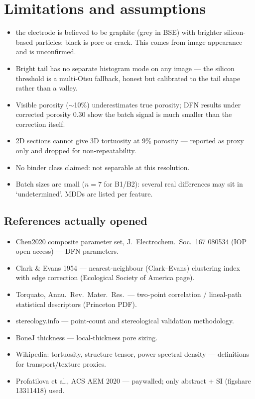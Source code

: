 \documentclass[11pt,a4paper]{article}
\begin{document}
\section{Limitations and assumptions}
\begin{itemize}
\item the electrode is believed to be graphite (grey in BSE) with brighter silicon-based particles; black is pore or crack. This comes from image appearance and is unconfirmed.
\item Bright tail has no separate histogram mode on any image --- the
silicon threshold is a multi-Otsu fallback, honest but calibrated to the
tail shape rather than a valley.
\item Visible porosity ($\sim$10\%) underestimates true porosity; DFN
results under corrected porosity 0.30 show the batch signal is much smaller
than the correction itself.
\item 2D sections cannot give 3D tortuosity at 9\% porosity --- reported as
proxy only and dropped for non-repeatability.
\item No binder class claimed: not separable at this resolution.
\item Batch sizes are small ($n{=}7$ for B1/B2): several real differences
may sit in `undetermined'. MDDs are listed per feature.
\end{itemize}

\subsection{References actually opened}
\begin{itemize}
\item Chen2020 composite parameter set, J.\ Electrochem.\ Soc.\ 167
080534 (IOP open access) --- DFN parameters.
\item Clark \& Evans 1954 --- nearest-neighbour (Clark--Evans) clustering
index with edge correction (Ecological Society of America page).
\item Torquato, Annu.\ Rev.\ Mater.\ Res.\ --- two-point correlation /
lineal-path statistical descriptors (Princeton PDF).
\item stereology.info --- point-count and stereological validation
methodology.
\item BoneJ thickness --- local-thickness pore sizing.
\item Wikipedia: tortuosity, structure tensor, power spectral density ---
definitions for transport/texture proxies.
\item Profatilova et al., ACS AEM 2020 --- paywalled; only abstract + SI
(figshare 13311418) used.
\end{itemize}
\end{document}
